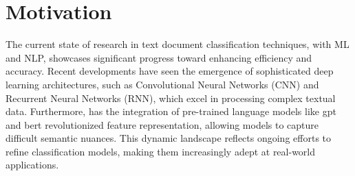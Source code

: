 \section{Motivation}

The current state of research in text document classification techniques, with ML and NLP, showcases significant progress toward enhancing efficiency and accuracy. Recent developments have seen the emergence of sophisticated deep learning architectures, such as Convolutional Neural Networks (CNN) and Recurrent Neural Networks (RNN), which excel in processing complex textual data. Furthermore, has the integration of pre-trained language models like \ac{gpt} and \ac{bert} revolutionized feature representation, allowing models to capture difficult semantic nuances. This dynamic landscape reflects ongoing efforts to refine classification models, making them increasingly adept at real-world applications.











